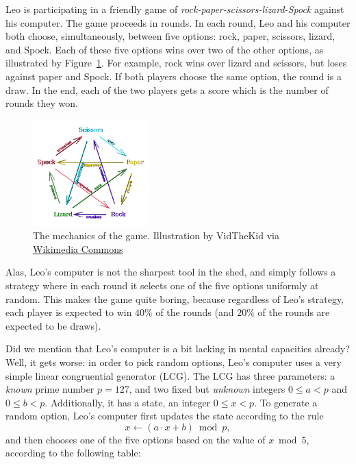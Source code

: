 
Leo is participating in a friendly game of
\emph{rock-paper-scissors-lizard-Spock} against his computer.  The
game proceeds in rounds.  In each round, Leo and his computer both
choose, simultaneously, between five options: rock, paper, scissors,
lizard, and Spock.  Each of these five options wins over two of the
other options, as illustrated by Figure~\ref{fig:rpsls}.  For example,
rock wins over lizard and scissors, but loses against paper and Spock.
If both players choose the same option, the round is a draw.
In the end, each of the two players gets a score which is the number
of rounds they won.

\begin{figure}[!h]
  \centering
  \includegraphics[width=0.4\textwidth]{rpsls}
  \caption{The mechanics of the game.  Illustration by VidTheKid via \href{http://commons.wikimedia.org/wiki/File:Rock_Paper_Scissors_Lizard_Spock_en.svg}{Wikimedia Commons}}
  \label{fig:rpsls}
\end{figure}

Alas, Leo's computer is not the sharpest tool in the shed, and simply
follows a strategy where in each round it selects one of the five
options uniformly at random.  This makes the game quite boring,
because regardless of Leo's strategy, each player is expected to win
$40\%$ of the rounds (and $20\%$ of the rounds are expected to be
draws). 

Did we mention that Leo's computer is a bit lacking in mental
capacities already?  Well, it gets worse: in order to pick random
options, Leo's computer uses a very simple linear congruential
generator (LCG).  The LCG has three parameters: a \emph{known} prime number $p =
127$, and two fixed but \emph{unknown} integers $0 \le a < p$ and $0
\le b < p$.  Additionally, it has a state, an integer $0 \le x < p$.
To generate a random option, Leo's computer first updates the state
according to the rule
\[
x \leftarrow (a \cdot x + b) \bmod p,
\]
and then chooses one of the five options based on the value of $x
\bmod 5$, according to the following table:

